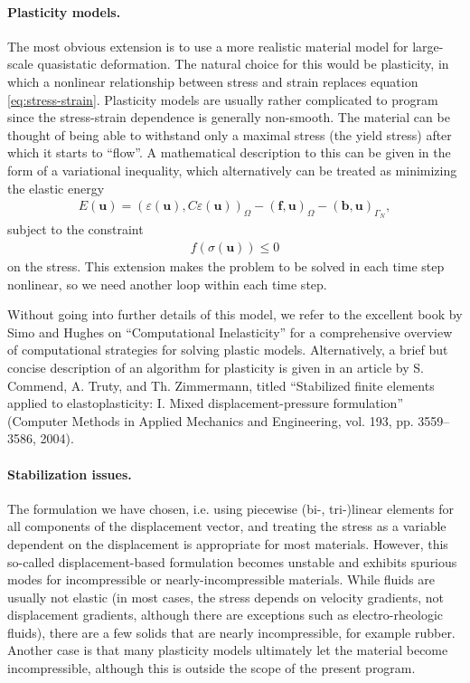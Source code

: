 \documentclass{article}
\renewcommand{\vec}[1]{\mathbf{#1}}
\begin{document}
\paragraph*{Plasticity models.} The most obvious extension is to use a more
realistic material model for large-scale quasistatic deformation. The natural
choice for this would be plasticity, in which a nonlinear relationship between
stress and strain replaces equation \eqref{eq:stress-strain}. Plasticity
models are usually rather complicated to program since the stress-strain
dependence is generally non-smooth. The material can be thought of being able
to withstand only a maximal stress (the yield stress) after which it starts to
``flow''. A mathematical description to this can be given in the form of a
variational inequality, which alternatively can be treated as minimizing the
elastic energy
\begin{gather}
  E(\vec u) = 
  (\varepsilon(\vec u), C\varepsilon(\vec u))_{\Omega}
  - (\vec f, \vec u)_{\Omega} - (\vec b, \vec u)_{\Gamma_N},
\end{gather}
subject to the constraint
\begin{gather}
  f(\sigma(\vec u)) \le 0
\end{gather}
on the stress. This extension makes the problem to be solved in each time step
nonlinear, so we need another loop within each time step.

Without going into further details of this model, we refer to the excellent
book by Simo and Hughes on ``Computational Inelasticity'' for a
comprehensive overview of computational strategies for solving plastic
models. Alternatively, a brief but concise description of an algorithm for
plasticity is given in an article by S. Commend, A. Truty, and Th. Zimmermann,
titled ``Stabilized finite elements applied to 
elastoplasticity: I. Mixed displacement-pressure formulation''
(Computer Methods in Applied Mechanics and Engineering, vol. 193,
pp. 3559--3586, 2004).


\paragraph*{Stabilization issues.} The formulation we have chosen, i.e. using
piecewise (bi-, tri-)linear elements for all components of the displacement
vector, and treating the stress as a variable dependent on the displacement is
appropriate for most materials. However, this so-called displacement-based
formulation becomes unstable and exhibits spurious modes for incompressible or
nearly-incompressible materials. While fluids are usually not elastic (in most
cases, the stress depends on velocity gradients, not displacement gradients,
although there are exceptions such as electro-rheologic fluids), there are a
few solids that are nearly incompressible, for example rubber. Another case is
that many plasticity models ultimately let the material become incompressible,
although this is outside the scope of the present program.
\end{document}
